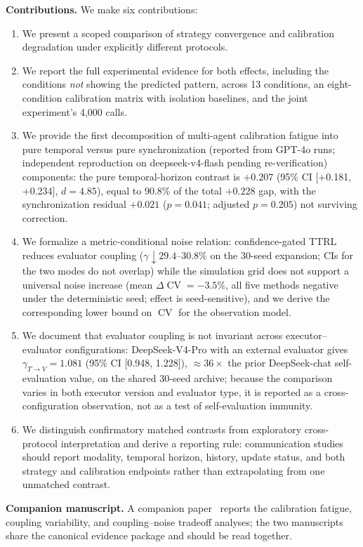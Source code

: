 \documentclass[11pt]{article}
\DeclareMathOperator{\CV}{CV}
\begin{document}
\textbf{Contributions.} We make six contributions:
\begin{enumerate}[leftmargin=*,nosep]
 \item We present a scoped comparison of strategy convergence and calibration degradation under explicitly different protocols.
 \item We report the full experimental evidence for both effects, including the conditions \textit{not} showing the predicted pattern, across 13 conditions, an eight-condition calibration matrix with isolation baselines, and the joint experiment's 4,000 calls.
 \item We provide the first decomposition of multi-agent calibration fatigue into pure temporal versus pure synchronization (reported from GPT-4o runs; independent reproduction on deepseek-v4-flash pending re-verification) components: the pure temporal-horizon contrast is $+0.207$ (95\% CI [+0.181, +0.234], $d{=}4.85$), equal to 90.8\% of the total $+0.228$ gap, with the synchronization residual $+0.021$ ($p{=}0.041$; adjusted $p{=}0.205$) not surviving correction.
 \item We formalize a metric-conditional noise relation: confidence-gated TTRL reduces evaluator coupling ($\gamma \downarrow 29.4$--$30.8\%$ on the 30-seed expansion; CIs for the two modes do not overlap) while the simulation grid does not support a universal noise increase (mean $\Delta\CV = -3.5\%$, all five methods negative under the deterministic seed; effect is seed-sensitive), and we derive the corresponding lower bound on $\CV$ for the observation model.
 \item We document that evaluator coupling is not invariant across executor--evaluator configurations: DeepSeek-V4-Pro with an external evaluator gives $\gamma_{T\to V}{=}1.081$ (95\% CI [0.948, 1.228]), $\approx 36\times$ the prior DeepSeek-chat self-evaluation value, on the shared 30-seed archive; because the comparison varies in both executor version and evaluator type, it is reported as a cross-configuration observation, not as a test of self-evaluation immunity.
 \item We distinguish confirmatory matched contrasts from exploratory cross-protocol interpretation and derive a reporting rule: communication studies should report modality, temporal horizon, history, update status, and both strategy and calibration endpoints rather than extrapolating from one unmatched contrast.
\end{enumerate}

\noindent\textbf{Companion manuscript.} A companion paper~\citep{companioncal2026} reports the calibration fatigue, coupling variability, and coupling--noise tradeoff analyses; the two manuscripts share the canonical evidence package and should be read together.
\end{document}
